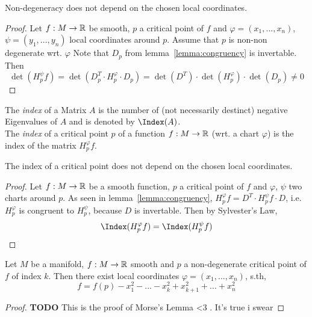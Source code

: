 \begin{lemma} 
   \label{lemma:non-degeneracy}
   Non-degeneracy does not depend on the chosen local coordinates.
\end{lemma}

\begin{proof}
   Let $f: M \rightarrow {\mathbb R}$ be smooth, $p$ a critical point of $f$ and 
   $\varphi = (x_1, ..., x_n)$, $\psi = (y_1, ..., y_n)$ local coordinates 
   around $p$. Assume that $p$ is non-non degenerate wrt. $\varphi$ Note that 
   $D_p$ from lemma~\ref{lemma:congruency} is invertable. Then
   \[ \det(H_p^{\psi}f) = \det(D_p^T \cdot H_p^{\varphi} \cdot D_p) = 
   \det(D^T) \cdot \det(H_p^{\varphi}) \cdot \det(D_p) \neq 0 \]
\end{proof}

\begin{definition}[Index]
   \label{def:index}

   The \textit{index} of a Matrix $A$ is the number of (not necessarily 
   destinct) negative Eigenvalues of $A$ and is denoted by $\Index(A)$. \\
    The \textit{index} of a critical point $p$ of a function 
    $f: M \rightarrow {\mathbb R}$ (wrt. a chart $\varphi$) is the index of the matrix 
    $H_p^{\varphi}f$.
\end{definition}

\begin{lemma}
   \label{lemma:index}
   The index of a critical point does not depend on the chosen local coordinates.
\end{lemma}

\begin{proof}
   Let $f: M \rightarrow {\mathbb R}$ be a smooth function, $p$ a critical point of $f$
   and $\varphi$, $\psi$ two charts around $p$.
   As seen in lemma~\ref{lemma:congruency}, 
   $H_p^{\varphi}f = D^T \cdot H_p^{\psi}f \cdot D$, i.e.
   $H_p^{\varphi}$ is congruent to $H_p^{\psi}$, because $D$ is invertable. 
   Then by Sylvester's Law, 
   \[ \Index(H_p^{\varphi}f) = \Index(H_p^{\psi}f) \]
\end{proof}

\begin{theorem}
   \label{theorem:morse lemma}

   Let $M$ be a manifold, $f: M \rightarrow {\mathbb R}$ smooth and $p$ a non-degenerate 
   critical point of $f$ of index $k$. Then there exist local coordinates 
   $\varphi = (x_1, ..., x_n)$, s.th,
   \[ f = f(p) - x_1^2 - ... - x_k^2 + x_{k+1}^2 + ... + x_n^2 \]
\end{theorem}

\begin{proof}
   \textbf{TODO}
   This is the proof of Morse's Lemma <3 . It's true i swear
\end{proof}
